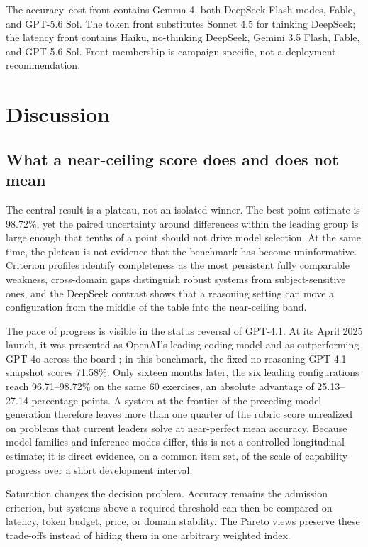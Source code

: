 \documentclass[11pt,a4paper,twocolumn]{article}
\begin{document}
The accuracy--cost front contains Gemma 4, both DeepSeek Flash modes, Fable,
and GPT-5.6 Sol. The token front substitutes Sonnet 4.5 for thinking DeepSeek;
the latency front contains Haiku, no-thinking DeepSeek, Gemini 3.5 Flash,
Fable, and GPT-5.6 Sol. Front membership is campaign-specific, not a deployment
recommendation.

\section{Discussion}

\subsection{What a near-ceiling score does and does not mean}

The central result is a plateau, not an isolated winner. The best point estimate
is 98.72\%, yet the paired uncertainty around differences within the leading
group is large enough that tenths of a point should not drive model selection.
At the same time, the plateau is not evidence that the benchmark has become
uninformative. Criterion profiles identify completeness as the most persistent
fully comparable weakness, cross-domain gaps distinguish robust systems from
subject-sensitive ones, and the DeepSeek contrast shows that a reasoning
setting can move a configuration from the middle of the table into the
near-ceiling band.

The pace of progress is visible in the status reversal of GPT-4.1. At its
April 2025 launch, it was presented as OpenAI's leading coding model and as
outperforming GPT-4o across the board \citep{openai2025gpt41launch}; in this
benchmark, the fixed no-reasoning GPT-4.1 snapshot scores 71.58\%. Only sixteen
months later, the six leading configurations reach 96.71--98.72\% on the same
60 exercises, an absolute advantage of 25.13--27.14 percentage points. A system
at the frontier of the preceding model generation therefore leaves more than
one quarter of the rubric score unrealized on problems that current leaders
solve at near-perfect mean accuracy. Because model families and inference modes
differ, this is not a controlled longitudinal estimate; it is direct evidence,
on a common item set, of the scale of capability progress over a short
development interval.

Saturation changes the decision problem. Accuracy remains the admission
criterion, but systems above a required threshold can then be compared on
latency, token budget, price, or domain stability. The Pareto views preserve
these trade-offs instead of hiding them in one arbitrary weighted index.
\end{document}
